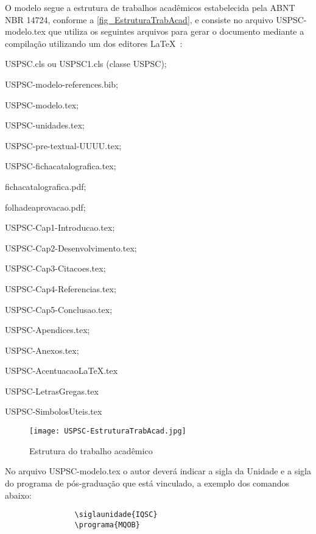 O modelo segue a estrutura de trabalhos acadêmicos estabelecida pela ABNT NBR 14724, conforme a \autoref{fig_EstruturaTrabAcad}, e consiste no arquivo USPSC-modelo.tex que utiliza os seguintes arquivos para gerar o documento mediante a compilação utilizando um dos editores \LaTeX\ :
\begin{alineas}	 
				\item USPSC.cls ou USPSC1.cls (classe USPSC); 
				\item USPSC-modelo-references.bib;
				\item USPSC-modelo.tex;
				\item USPSC-unidades.tex;
				\item USPSC-pre-textual-UUUU.tex;
				\item USPSC-fichacatalografica.tex;
				\item fichacatalografica.pdf;
				\item folhadeaprovacao.pdf;
				\item USPSC-Cap1-Introducao.tex;
				\item USPSC-Cap2-Desenvolvimento.tex;
				\item USPSC-Cap3-Citacoes.tex;
				\item USPSC-Cap4-Referencias.tex;
				\item USPSC-Cap5-Conclusao.tex;
				\item USPSC-Apendices.tex;
				\item USPSC-Anexos.tex;
				\item USPSC-AcentuacaoLaTeX.tex
				\item USPSC-LetrasGregas.tex
				\item USPSC-SimbolosUteis.tex
\end{alineas}	 

\begin{figure}[htb]
	\caption{\label{fig_EstruturaTrabAcad}Estrutura do trabalho acadêmico}
	\begin{center}
		\texttt{[image: USPSC-EstruturaTrabAcad.jpg]}
	\end{center}
\end{figure}

				
			 No arquivo USPSC-modelo.tex o autor deverá indicar a sigla da Unidade e a sigla do programa de pós-graduação que está vinculado, a exemplo dos comandos abaixo:
		
			\begin{verbatim}
				\siglaunidade{IQSC}
				\programa{MQOB}
			\end{verbatim}

